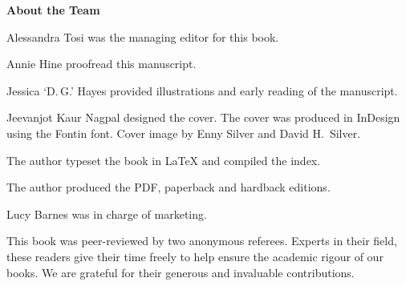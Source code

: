 \clearpage
\thispagestyle{empty}
\vspace*{\fill}
\begin{center}
{\large\bfseries About the Team}
\end{center}
\vspace{1em}
\begin{flushleft}
\small
Alessandra Tosi was the managing editor for this book.

\vspace{0.5em}
Annie Hine proofread this manuscript.

\vspace{0.5em}
Jessica `D.\,G.' Hayes provided illustrations and early reading of the manuscript.

\vspace{0.5em}
Jeevanjot Kaur Nagpal designed the cover. The cover was produced in InDesign using the Fontin font. Cover image by Enny Silver and David H.\ Silver.

\vspace{0.5em}
The author typeset the book in \LaTeX{} and compiled the index.

\vspace{0.5em}
The author produced the PDF, paperback and hardback editions.

\vspace{0.5em}
Lucy Barnes was in charge of marketing.

\vspace{1em}
This book was peer-reviewed by two anonymous referees. Experts in their field, these readers give their time freely to help ensure the academic rigour of our books. We are grateful for their generous and invaluable contributions.
\end{flushleft}
\vspace*{\fill}
\clearpage
